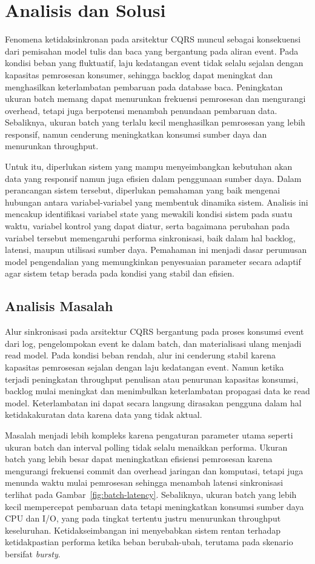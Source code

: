 \chapter{Analisis dan Solusi}

Fenomena ketidaksinkronan pada arsitektur CQRS muncul sebagai konsekuensi dari pemisahan model tulis dan baca yang bergantung pada aliran event.
Pada kondisi beban yang fluktuatif, laju kedatangan event tidak selalu sejalan dengan kapasitas pemrosesan konsumer, sehingga backlog dapat meningkat dan menghasilkan keterlambatan pembaruan pada database baca.
Peningkatan ukuran batch memang dapat menurunkan frekuensi pemrosesan dan mengurangi overhead, tetapi juga berpotensi menambah penundaan pembaruan data.
Sebaliknya, ukuran batch yang terlalu kecil menghasilkan pemrosesan yang lebih responsif, namun cenderung meningkatkan konsumsi sumber daya dan menurunkan throughput.

Untuk itu, diperlukan sistem yang mampu menyeimbangkan kebutuhan akan data yang responsif namun juga efisien dalam penggunaan sumber daya.
Dalam perancangan sistem tersebut, diperlukan pemahaman yang baik mengenai hubungan antara variabel-variabel yang membentuk dinamika sistem.
Analisis ini mencakup identifikasi variabel state yang mewakili kondisi sistem pada suatu waktu, variabel kontrol yang dapat diatur, serta bagaimana perubahan pada variabel tersebut memengaruhi performa sinkronisasi, baik dalam hal backlog, latensi, maupun utilisasi sumber daya.
Pemahaman ini menjadi dasar perumusan model pengendalian yang memungkinkan penyesuaian parameter secara adaptif agar sistem tetap berada pada kondisi yang stabil dan efisien.

\section{Analisis Masalah}

Alur sinkronisasi pada arsitektur CQRS bergantung pada proses konsumsi event dari log, pengelompokan event ke dalam batch, dan materialisasi ulang menjadi read model.
Pada kondisi beban rendah, alur ini cenderung stabil karena kapasitas pemrosesan sejalan dengan laju kedatangan event.
Namun ketika terjadi peningkatan throughput penulisan atau penurunan kapasitas konsumsi, backlog mulai meningkat dan menimbulkan keterlambatan propagasi data ke read model.
Keterlambatan ini dapat secara langsung dirasakan pengguna dalam hal ketidakakuratan data karena data yang tidak aktual.

Masalah menjadi lebih kompleks karena pengaturan parameter utama seperti ukuran batch dan interval polling tidak selalu menaikkan performa.
Ukuran batch yang lebih besar dapat meningkatkan efisiensi pemrosesan karena mengurangi frekuensi commit dan overhead jaringan dan komputasi, tetapi juga menunda waktu mulai pemrosesan sehingga menambah latensi sinkronisasi terlihat pada Gambar~\ref{fig:batch-latency}.
Sebaliknya, ukuran batch yang lebih kecil mempercepat pembaruan data tetapi meningkatkan konsumsi sumber daya CPU dan I/O, yang pada tingkat tertentu justru menurunkan throughput keseluruhan.
Ketidakseimbangan ini menyebabkan sistem rentan terhadap ketidakpastian performa ketika beban berubah-ubah, terutama pada skenario bersifat \emph{bursty}.

